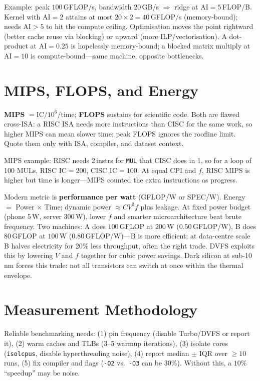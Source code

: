Example: peak $100$\,GFLOP/s, bandwidth $20$\,GB/s $\Rightarrow$ ridge at $\text{AI}=5$\,FLOP/B. Kernel with $\text{AI}=2$ attains at most $20\times2=40$\,GFLOP/s (memory-bound); needs $\text{AI}>5$ to hit the compute ceiling. Optimisation moves the point rightward (better cache reuse via blocking) or upward (more ILP/vectorisation). A dot-product at $\text{AI}=0.25$ is hopelessly memory-bound; a blocked matrix multiply at $\text{AI}=10$ is compute-bound---same machine, opposite bottlenecks.

\section{MIPS, FLOPS, and Energy}
\textbf{MIPS} $=\text{IC}/10^6/\text{time}$; \textbf{FLOPS} sustains for scientific code.
Both are flawed cross-ISA: a RISC ISA needs more instructions than CISC for the same
work, so higher MIPS can mean slower time; peak FLOPS ignores the roofline limit.
Quote them only with ISA, compiler, and dataset context.

MIPS example: RISC needs 2\,instrs for \texttt{MUL} that CISC does in 1, so for a
loop of 100 MULs, RISC IC$=200$, CISC IC$=100$. At equal CPI and $f$, RISC MIPS is
higher but time is longer---MIPS counted the extra instructions as progress.

Modern metric is \textbf{performance per watt} (GFLOP/W or SPEC/W).
Energy $=$ Power $\times$ Time; dynamic power $\approx C V^2 f$ plus leakage.
At fixed power budget (phone $5$\,W, server $300$\,W), lower $f$ and smarter
microarchitecture beat brute frequency.
Two machines: A does $100$\,GFLOP at $200$\,W ($0.50$\,GFLOP/W),
B does $80$\,GFLOP at $100$\,W ($0.80$\,GFLOP/W)---B is more efficient;
at data-centre scale B halves electricity for 20\% less throughput, often the
right trade. DVFS exploits this by lowering $V$ and $f$ together for cubic
power savings. Dark silicon at sub-10\,nm forces this trade: not all transistors
can switch at once within the thermal envelope.

\section{Measurement Methodology}
Reliable benchmarking needs: (1) pin frequency (disable Turbo/DVFS or report it),
(2) warm caches and TLBs (3--5 warmup iterations), (3) isolate cores
(\texttt{isolcpus}, disable hyperthreading noise), (4) report median $\pm$ IQR
over $\ge 10$ runs, (5) fix compiler and flags (\texttt{-O2} vs.\ \texttt{-O3}
can be $30\%$). Without this, a $10\%$ ``speedup'' may be noise.

